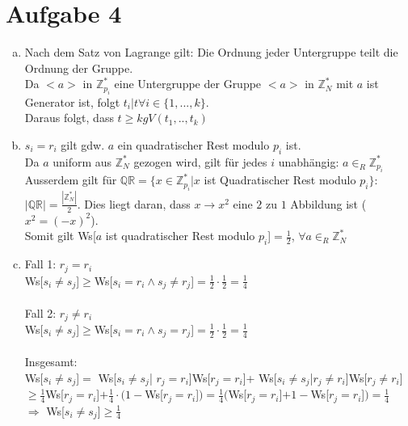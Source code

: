 \documentclass[a4paper]{scrartcl}
\begin{document}
\section*{Aufgabe 4}
\begin{enumerate}[a)]
\item Nach dem Satz von Lagrange gilt: Die Ordnung jeder Untergruppe teilt die Ordnung der Gruppe.\\
Da $<a>$ in $\mathbb{Z}_{p_i}^*$ eine Untergruppe der Gruppe $<a>$ in $\mathbb{Z}_N^*$ mit $a$ ist Generator ist, folgt $t_i | t \forall i \in \{1, ..., k\}$.\\
Daraus folgt, dass $t\geq kgV(t_1,..,t_k)$


\item $s_i = r_i$ gilt gdw. $a$ ein quadratischer Rest modulo $p_i$ ist.\\
 Da $a$ uniform aus $\mathbb{Z}_N^*$ gezogen wird, gilt für jedes $i$ unabhängig: $a\in_R\mathbb{Z}_{p_i}^*$\\
Ausserdem gilt für $\mathbb{QR}=\{x\in \mathbb{Z}_{p_i}^*|x$ ist Quadratischer Rest modulo $p_i\}$: $|\mathbb{QR}|=\frac{|\mathbb{Z}_N^*|}{2}$. Dies liegt daran, dass $x \rightarrow x^2$ eine $2$ zu $1$ Abbildung ist ($x^2=(-x)^2$).\\
Somit gilt Ws[$a$ ist quadratischer Rest modulo $p_i$]$=\frac{1}{2}$, $\forall a\in_R\mathbb{Z}_N^*$

\item Fall 1: $r_j=r_i$\\
Ws[$s_i\neq s_j$]$\geq$Ws[$s_i = r_i \wedge s_j \neq r_j$]$=\frac{1}{2}\cdot \frac{1}{2}= \frac{1}{4}$\\\\

Fall 2: $r_j \neq r_i$\\
Ws[$s_i\neq s_j$]$\geq$Ws[$s_i = r_i \wedge s_j = r_j$]$=\frac{1}{2}\cdot \frac{1}{2}=\frac{1}{4}$\\\\

Insgesamt:\\
Ws[$s_i \neq s_j$]$=$ Ws[$s_i \neq s_j$| $r_j=r_i$]Ws[$r_j=r_i$]+  Ws[$s_i \neq s_j$|$r_j \neq r_i$]Ws[$r_j \neq r_i$]$ \geq\frac{1}{4}$Ws[$r_j=r_i$]$+ \frac{1}{4}\cdot (1-$Ws[$r_j=r_i$]$)=\frac{1}{4}($Ws[$r_j=r_i$]$+1-$Ws[$r_j=r_i$]$)=\frac{1}{4}$\\
$\Rightarrow$ Ws[$s_i \neq s_j$]$\geq \frac{1}{4}$


\end{enumerate}
\end{document}
